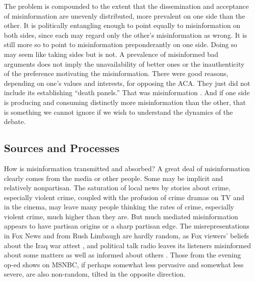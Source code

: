 \documentclass[11pt]{article}
\begin{document}
The problem is compounded to the extent that the dissemination and acceptance of misinformation are unevenly distributed, more prevalent on one side than the other. It is politically entangling enough to point equally to misinformation on both sides, since each may regard only the other's misinformation as wrong. It is still more so to point to misinformation preponderantly on one side. Doing so may seem like taking sides but is not. A prevalence of misinformed bad arguments does not imply the unavailability of better ones or the inauthenticity of the preference motivating the misinformation. There were good reasons, depending on one's values and interests, for opposing the ACA. They just did not include its establishing ``death panels.'' That was misinformation \citep{nyhan2010a}. And if one side is producing and consuming distinctly more misinformation than the other, that is something we cannot ignore if we wish to understand the dynamics of the debate.

\subsection{Sources and Processes}

How is misinformation transmitted and absorbed? A great deal of misinformation clearly comes from the media or other people. Some may be implicit and relatively nonpartisan. The saturation of local news by stories about crime, especially violent crime, coupled with the profusion of crime dramas on TV and in the cinema, may leave many people thinking the rates of crime, especially violent crime, much higher than they are. But much mediated misinformation appears to have partisan origins or a sharp partisan edge. The misrepresentations in Fox News and from Rush Limbaugh are hardly random, as Fox viewers' beliefs about the Iraq war attest \citep{kull2003, berinsky2009}, and political talk radio leaves its listeners misinformed about some matters as well as informed about others \citep{hofstetter1999}. Those from the evening op-ed shows on MSNBC, if perhaps somewhat less pervasive and somewhat less severe, are also non-random, tilted in the opposite direction.
\end{document}
